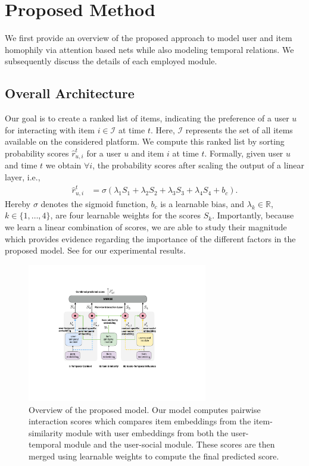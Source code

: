 \section{Proposed Method}
We first provide an overview of the proposed \ours {} approach to model user and item homophily via attention based nets while also modeling temporal relations. We subsequently discuss the details of each employed module.

\subsection{Overall Architecture}
Our goal is to create a ranked list of items, indicating the preference of a user $u$ for interacting with item $i\in{\mathcal I}$ at time $t$. Here, ${\mathcal I}$ represents the set of all items available on the considered platform. We compute this ranked list by sorting probability scores $\hat{r}_{u,i}^{t}$ for a user $u$ and item $i$ at time $t$. Formally, given user $u$ and time $t$
we obtain $\forall i$,  the probability scores  after scaling the output of a linear layer, i.e.,
\begin{align}
  \hat{r}_{u,i}^{t} &= \sigma \left(\lambda_1S_1 + \lambda_2S_2 + \lambda_3S_3+\lambda_4S_4+ b_c\right).
  \label{eq:fuse}
\end{align}
Hereby $\sigma$ denotes the sigmoid function, $b_c$ is a learnable bias, and $\lambda_k\in\mathbb{R}$, $k\in\{1, \ldots, 4\}$, are four learnable weights for the scores $S_k$. Importantly, because we learn a linear combination of scores, we are able to study their magnitude which provides %
evidence regarding the importance of the different factors in the proposed \ours {} model. See  for our experimental results.

\begin{figure}[th]
  \centering
  \includegraphics[width=0.7\textwidth]{figures/Overall_new}
  \caption{Overview of the proposed \ours {} model.  Our model computes pairwise interaction scores which compares item embeddings from the item-similarity module with user embeddings from both the user-temporal module and the user-social module. These scores are then merged using learnable weights to compute the final predicted score.
  }
  \label{fig:overview}
\end{figure}

